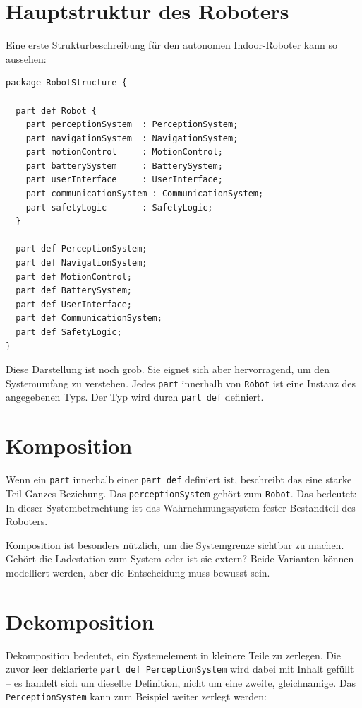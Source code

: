 \section{Hauptstruktur des Roboters}
Eine erste Strukturbeschreibung für den autonomen Indoor-Roboter kann so aussehen:

\begin{lstlisting}
package RobotStructure {

  part def Robot {
    part perceptionSystem  : PerceptionSystem;
    part navigationSystem  : NavigationSystem;
    part motionControl     : MotionControl;
    part batterySystem     : BatterySystem;
    part userInterface     : UserInterface;
    part communicationSystem : CommunicationSystem;
    part safetyLogic       : SafetyLogic;
  }

  part def PerceptionSystem;
  part def NavigationSystem;
  part def MotionControl;
  part def BatterySystem;
  part def UserInterface;
  part def CommunicationSystem;
  part def SafetyLogic;
}
\end{lstlisting}

Diese Darstellung ist noch grob. Sie eignet sich aber hervorragend, um den Systemumfang zu verstehen. Jedes \texttt{part} innerhalb von \texttt{Robot} ist eine Instanz des angegebenen Typs. Der Typ wird durch \texttt{part def} definiert.

\section{Komposition}
Wenn ein \texttt{part} innerhalb einer \texttt{part def} definiert ist, beschreibt das eine starke Teil-Ganzes-Beziehung. Das \texttt{perceptionSystem} gehört zum \texttt{Robot}. Das bedeutet: In dieser Systembetrachtung ist das Wahrnehmungssystem fester Bestandteil des Roboters.

Komposition ist besonders nützlich, um die Systemgrenze sichtbar zu machen. Gehört die Ladestation zum System oder ist sie extern? Beide Varianten können modelliert werden, aber die Entscheidung muss bewusst sein.

\section{Dekomposition}
Dekomposition bedeutet, ein Systemelement in kleinere Teile zu zerlegen. Die zuvor leer deklarierte \texttt{part def PerceptionSystem} wird dabei mit Inhalt gefüllt – es handelt sich um dieselbe Definition, nicht um eine zweite, gleichnamige. Das \texttt{PerceptionSystem} kann zum Beispiel weiter zerlegt werden:

